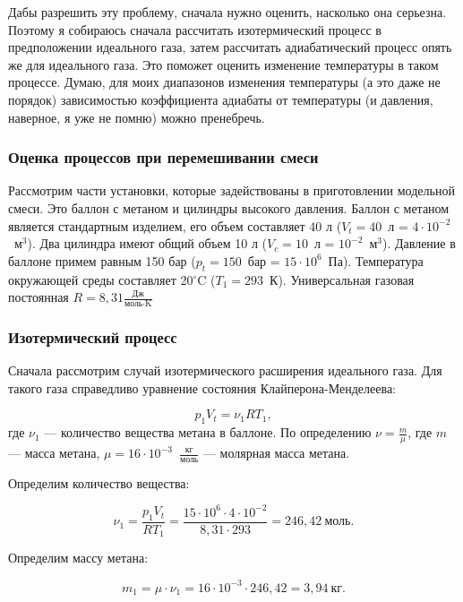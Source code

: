 \documentclass[a4paper,14pt]{article}
\theoremstyle{plain} %
\theoremstyle{definition} %
\theoremstyle{remark} %
\begin{document}
Дабы разрешить эту проблему, сначала нужно оценить, насколько она серьезна. Поэтому я собираюсь сначала рассчитать изотермический процесс в предположении идеального газа, затем рассчитать адиабатический процесс опять же для идеального газа. Это поможет оценить изменение температуры в таком процессе. Думаю, для моих диапазонов изменения температуры (а это даже не порядок) зависимостью коэффициента адиабаты от температуры (и давления, наверное, я уже не помню) можно пренебречь. 

\subsubsection{Оценка процессов при перемешивании смеси}

Рассмотрим части установки, которые задействованы в приготовлении модельной смеси. Это баллон с метаном и цилиндры высокого давления. Баллон с метаном является стандартным изделием, его объем составляет 40 л ($V_t = 40$~л = $4 \cdot 10^{-2}$~м$^3$). Два цилиндра имеют общий объем 10 л ($V_c = 10$~л = $10^{-2}$~м$^3$). Давление в баллоне примем равным 150 бар ($p_t = 150$~бар = $15 \cdot 10^6$~Па). Температура окружающей среды составляет 20$^\circ$C ($T_1 = 293$~К). Универсальная газовая постоянная $R = 8,31 \frac{\textrm{Дж}}{\textrm{моль}\cdot\textrm{K}}$ 

\subsubsection{Изотермический процесс}

Сначала рассмотрим случай изотермического расширения идеального газа. Для такого газа справедливо уравнение состояния Клайперона-Менделеева:

\begin{equation}
	p_1 V_t = \nu_1 R T_1,
\end{equation}
где $\nu_1$ --- количество вещества метана в баллоне. По определению $\nu = \frac{m}{\mu}$, где $m$ --- масса метана, $\mu = 16 \cdot 10^{-3}$~$\frac{\textrm{кг}}{\textrm{моль}}$ --- молярная масса метана.

Определим количество вещества:

\begin{equation}
	\nu_1 = \frac{p_1 V_t}{R T_1} = \frac{15 \cdot 10^6 \cdot 4 \cdot 10^{-2}}{8,31 \cdot 293} = 246,42~\textrm{моль}.
\end{equation} 

Определим массу метана:

\begin{equation}
	m_1 = \mu \cdot \nu_1 = 16 \cdot 10^{-3} \cdot 246,42 = 3,94~\textrm{кг}.
\end{equation}
\end{document}
